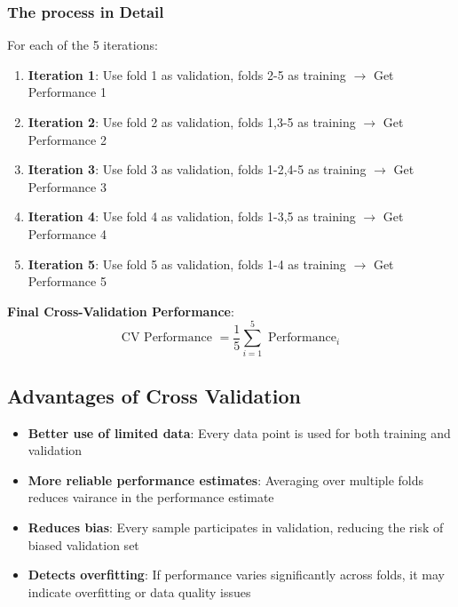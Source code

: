 \documentclass[a4paper]{article}
\theoremstyle{definition}
\begin{document}
\subsubsection{The process in Detail}
For each of the 5 iterations:
\begin{enumerate}
    \item \textbf{Iteration 1}: Use fold 1 as validation, folds 2-5 as training \( \rightarrow \) Get Performance 1 
    \item \textbf{Iteration 2}: Use fold 2 as validation, folds 1,3-5 as training \( \rightarrow \) Get Performance 2
    \item \textbf{Iteration 3}: Use fold 3 as validation, folds 1-2,4-5 as training  \( \rightarrow \) Get Performance 3 
    \item \textbf{Iteration 4}: Use fold 4 as validation, folds 1-3,5 as training  \( \rightarrow \) Get Performance 4 
    \item \textbf{Iteration 5}: Use fold 5 as validation, folds 1-4 as training  \( \rightarrow \) Get Performance 5
\end{enumerate}
\textbf{Final Cross-Validation Performance}:
\[
  \text{CV Performance } = \frac{1}{5} \sum_{i = 1}^{5} \text{ Performance}_i
\]
\subsection{Advantages of Cross Validation}
\begin{itemize}
    \item \textbf{Better use of limited data}: Every data point is used for both training and validation 
    \item \textbf{More reliable performance estimates}: Averaging over multiple folds reduces vairance in the performance estimate 
    \item \textbf{Reduces bias}: Every sample participates in validation, reducing the risk of biased validation set 
    \item \textbf{Detects overfitting}: If performance varies significantly across folds, it may indicate overfitting or data quality issues
\end{itemize}
\end{document}
